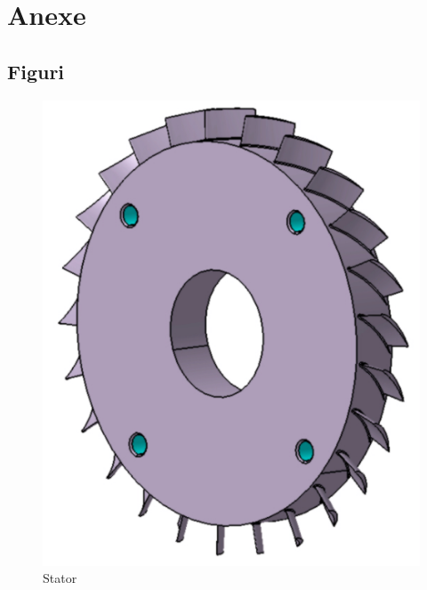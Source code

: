 \appendix

\chapter{Anexe}

\section{Figuri}

\begin{figure}[h]
	\centering
	\includegraphics[scale=0.4]{figures/stator-CAD.PNG}
	\caption{Stator}
	\label{Stator}
\end{figure}

